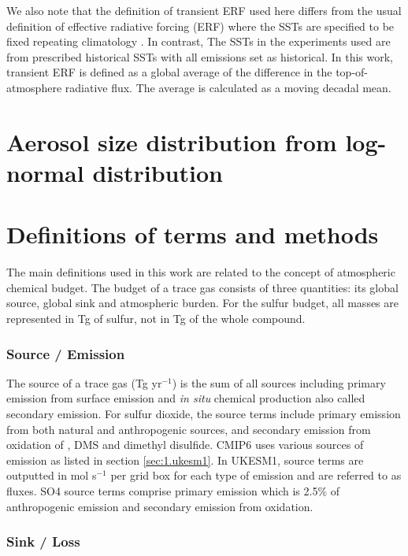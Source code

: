 We also note that the definition of transient ERF used here differs from the usual definition of effective radiative forcing (ERF) where the SSTs are specified to be fixed repeating climatology \citep{eyringOverviewCoupledModel2016}. In contrast, The SSTs in the experiments used are from prescribed historical SSTs with all emissions set as historical. In this work, transient ERF is defined as a global average of the difference in the top-of-atmosphere radiative flux. The average is calculated as a moving decadal mean.   


\section{Aerosol size distribution from log-normal distribution}

\section{Definitions of terms and methods}
\label{sec:2.terms}
The main definitions used in this work are related to the concept of atmospheric chemical budget. The budget of a trace gas consists of three quantities: its global source, global sink and atmospheric burden. For the sulfur budget, all masses are represented in Tg of sulfur, not in Tg of the whole compound.

\subsubsection{Source / Emission}

The source of a trace gas (Tg yr$^{-1}$) is the sum of all sources including primary emission from surface emission and \textit{in situ} chemical production also called secondary emission. For sulfur dioxide, the source terms include primary emission from both natural and anthropogenic sources, and secondary emission from oxidation of , DMS and dimethyl disulfide. CMIP6 uses various sources of  emission as listed in section \ref{sec:1.ukesm1}. In UKESM1, source terms are outputted in mol s$^{-1}$ per grid box for each type of emission and are referred to as fluxes. SO4 source terms comprise primary emission which is 2.5\% of anthropogenic  emission and secondary emission from  oxidation.

\subsubsection{Sink / Loss}

